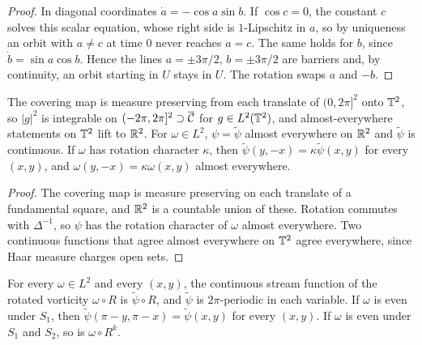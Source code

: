 \begin{proof}
\leanok
In diagonal coordinates $\dot a=-\cos a\sin b$. If $\cos c=0$, the constant $c$ solves
this scalar equation, whose right side is $1$-Lipschitz in $a$, so by uniqueness an orbit
with $a\ne c$ at time $0$ never reaches $a=c$. The same holds for $b$, since
$\dot b=\sin a\cos b$. Hence the lines $a=\pm3\pi/2$, $b=\pm3\pi/2$ are barriers and, by
continuity, an orbit starting in $U$ stays in $U$. The rotation swaps $a$ and $-b$.
\end{proof}

\begin{lemma}
\label{lem:lift-representatives}
\leanok
The covering map is measure preserving from each translate of $(0,2\pi]^2$ onto $\mathbb{T}^2$, so
$|g|^2$ is integrable on $(-2\pi,2\pi]^2\supset\overline{\mathcal{C}}$ for $g\in L^2(\mathbb{T}^2)$, and
almost-everywhere statements on $\mathbb{T}^2$ lift to $\mathbb{R}^2$. For $\omega\in L^2$, $\psi=\tilde\psi$
almost everywhere on $\mathbb{R}^2$ and $\tilde\psi$ is continuous. If $\omega$ has rotation
character $\kappa$, then $\tilde\psi(y,-x)=\kappa\tilde\psi(x,y)$ for every $(x,y)$, and
$\omega(y,-x)=\kappa\omega(x,y)$ almost everywhere.
\end{lemma}

\begin{proof}
\leanok
The covering map is measure preserving on each translate of a fundamental square, and
$\mathbb{R}^2$ is a countable union of these. Rotation commutes with $\Delta^{-1}$, so $\psi$ has
the rotation character of $\omega$ almost everywhere. Two continuous functions that agree
almost everywhere on $\mathbb{T}^2$ agree everywhere, since Haar measure charges open sets.
\end{proof}

\begin{lemma}
\label{lem:continuous-stream-symmetries}
\leanok
For every $\omega\in L^2$ and every $(x,y)$, the continuous stream function of the rotated
vorticity $\omega\circ R$ is $\tilde\psi\circ R$, and $\tilde\psi$ is $2\pi$-periodic in each
variable. If $\omega$ is even under $S_1$, then $\tilde\psi(\pi-y,\pi-x)=\tilde\psi(x,y)$ for every
$(x,y)$. If $\omega$ is even under $S_1$ and $S_2$, so is $\omega\circ R^k$.
\end{lemma}

